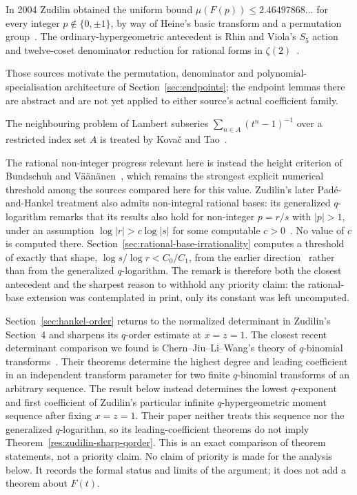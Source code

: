 \documentclass[11pt]{article}
\begin{document}
In 2004 Zudilin obtained the uniform bound
$\mu(F(p))\le2.46497868\ldots$ for every integer
$p\notin\{0,\pm1\}$, by way of Heine's basic transform and a permutation
group~\cite[Thm.~1, p.~154; Secs.~4--5, pp.~159--162]{zudilin2004}.
The ordinary-hypergeometric antecedent is Rhin and Viola's $S_5$ action and
twelve-coset denominator reduction for rational forms in
$\zeta(2)$~\cite[Sec.~3, pp.~38--42; Sec.~4, pp.~46--51]{rhinviola1996}.

Those sources motivate the permutation, denominator and polynomial-
specialisation architecture of Section~\ref{sec:endpoints}; the endpoint
lemmas there are abstract and are not yet applied to either source's actual
coefficient family.

The neighbouring problem of Lambert
subseries $\sum_{n\in A}(t^{n}-1)^{-1}$ over a restricted index set $A$ is
treated by Kova\v{c} and Tao~\cite{kovactao2024}.

The rational non-integer
progress relevant here is instead the height criterion of Bundschuh and
V\"a\"an\"anen~\cite{bv1994}, which remains the strongest explicit numerical
threshold among the sources compared here for this value.  Zudilin's later
Pad\'e-and-Hankel treatment also admits non-integral rational bases: its
generalized $q$-logarithm remarks that its results also hold for non-integer
$p=r/s$ with $|p|>1$, under an assumption $\log|r|>c\log|s|$ for some computable
$c>0$~\cite{zudilin2016}.  No value of $c$ is computed there.
Section~\ref{sec:rational-base-irrationality} computes a threshold of exactly
that shape, $\log s/\log r<C_0/C_1$, from the earlier
direction~\cite{zudilin2004} rather than from the generalized $q$-logarithm.
The remark is therefore both the closest antecedent and the sharpest reason to
withhold any priority claim: the rational-base extension was contemplated in
print, only its constant was left uncomputed.

Section~\ref{sec:hankel-order} returns to the normalized determinant in
Zudilin's Section~4 and sharpens its $q$-order estimate at $x=z=1$.  The
closest recent determinant comparison we found is Chern--Jiu--Li--Wang's
theory of $q$-binomial transforms~\cite{chern2026}.  Their theorems determine
the highest degree and leading coefficient in an independent transform
parameter for two finite $q$-binomial transforms of an arbitrary sequence.
The result below instead determines the lowest $q$-exponent and first
coefficient of Zudilin's particular infinite $q$-hypergeometric moment
sequence after fixing $x=z=1$.  Their paper neither treats this sequence nor
the generalized $q$-logarithm, so its leading-coefficient theorems do not imply
Theorem~\ref{res:zudilin-sharp-qorder}.  This is an exact comparison of theorem
statements, not a priority claim.
No claim of priority is made for the analysis below.  It records the formal
status and limits of the argument; it does not add a theorem about $F(t)$.
\end{document}
